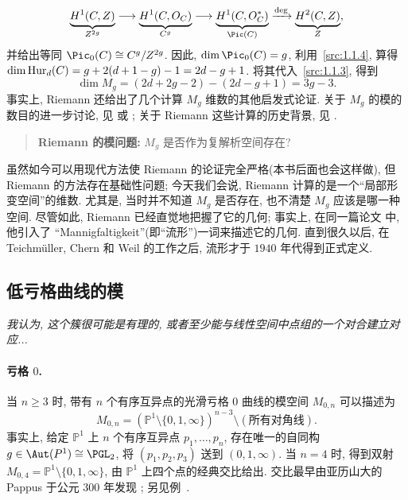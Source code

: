 \begin{equation}\label{src:1.1.5}
\underbrace{H^1(C,\mathbb Z)}_{\mathbb Z^{2g}}
\longrightarrow\underbrace{H^1(C,\mathcal O_C)}_{\mathbb C^g}
\longrightarrow\underbrace{H^1(C,\mathcal O_C^*)}_{\Pic(C)}
\xrightarrow{\deg}\underbrace{H^2(C,\mathbb Z)}_{\mathbb Z},
\end{equation}
并给出等同 $\Pic_0(C)\cong\mathbb C^g/\mathbb Z^{2g}$. 因此, $\dim\Pic_0(C)=g$, 利用~\eqref{src:1.1.4}, 算得 $\dim\operatorname{Hur}_d(C)=g+2(d+1-g)-1=2d-g+1$. 将其代入~\eqref{src:1.1.3}, 得到
\[
\dim M_g=(2d+2g-2)-(2d-g+1)=3g-3.
\]
事实上, Riemann 还给出了几个计算 $M_g$ 维数的其他启发式论证. 关于 $M_g$ 的模的数目的进一步讨论, 见 \cite[第 $255$--$257$ 页]{GH78} 或 \cite[第 $211$--$215$ 页]{Mir95}; 关于 Riemann 这些计算的历史背景, 见 \cite{AJP16}.
\begin{quote}
\textbf{Riemann 的模问题: }$M_g$ 是否作为复解析空间存在?
\end{quote}
虽然如今可以用现代方法使 Riemann 的论证完全严格(本书后面也会这样做), 但 Riemann 的方法存在基础性问题; 今天我们会说, Riemann 计算的是一个``局部形变空间''的维数. 尤其是, 当时并不知道 $M_g$ 是否存在, 也不清楚 $M_g$ 应该是哪一种空间. 尽管如此, Riemann 已经直觉地把握了它的几何; 事实上, 在同一篇论文 \cite{Rie57} 中, 他引入了 ``Mannigfaltigkeit''(即``流形'')一词来描述它的几何. 直到很久以后, 在 Teichmüller, Chern 和 Weil 的工作之后, 流形才于 $1940$ 年代得到正式定义.

\subsection{低亏格曲线的模}\label{src:1.1.2-subsection}
\begin{epigraph}
\textit{我认为, 这个簇很可能是有理的, 或者至少能与线性空间中点组的一个对合建立对应...}
\end{epigraph}
\paragraph*{亏格 $0$.} 当 $n\geq3$ 时, 带有 $n$ 个有序互异点的光滑亏格 $0$ 曲线的模空间 $M_{0,n}$ 可以描述为
\[
M_{0,n}=\left(\mathbb P^1\setminus\{0,1,\infty\}\right)^{n-3}\setminus(\text{所有对角线}).
\]
事实上, 给定 $\mathbb P^1$ 上 $n$ 个有序互异点 $p_1,\ldots,p_n$, 存在唯一的自同构 $g\in\Aut(\mathbb P^1)\cong\PGL_2$, 将 $(p_1,p_2,p_3)$ 送到 $(0,1,\infty)$. 当 $n=4$ 时, 得到双射 $M_{0,4}=\mathbb P^1\setminus\{0,1,\infty\}$, 由 $\mathbb P^1$ 上四个点的经典交比给出. 交比最早由亚历山大的 Pappus 于公元 $300$ 年发现 \cite{Ale86}; 另见例~.

